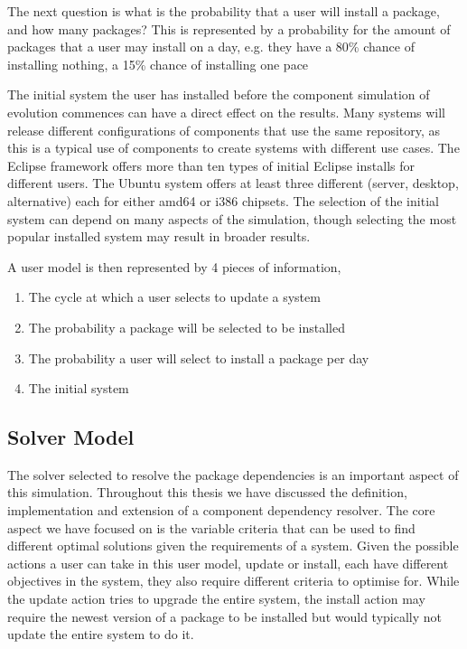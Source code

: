The next question is what is the probability that a user will install a package, and how many packages?
This is represented by a probability for the amount of packages that a user may install on a day,
e.g. they have a 80\% chance of installing nothing, a 15\% chance of installing one pace

The initial system the user has installed before the component simulation of evolution commences can have a direct effect on the results.
Many systems will release different configurations of components that use the same repository, as this is a typical use of components to create systems with different use cases.
The Eclipse framework offers more than ten types of initial Eclipse installs for different users.
The Ubuntu system offers at least three different (server, desktop, alternative) each for either amd64 or i386 chipsets.
The selection of the initial system can depend on many aspects of the simulation, 
though selecting the most popular installed system may result in broader results. 

A user model is then represented by 4 pieces of information,
\begin{enumerate}
  \item  The cycle at which a user selects to update a system
  \item The probability a package will be selected to be installed
  \item The probability a user will select to install a package per day
  \item The initial system
\end{enumerate}


\subsection{Solver Model}
The solver selected to resolve the package dependencies is an important aspect of this simulation.
Throughout this thesis we have discussed the definition, implementation and extension of a component dependency resolver.
The core aspect we have focused on is the variable criteria that can be used to find different optimal solutions given the requirements of a system.
Given the possible actions a user can take in this user model, update or install, each have different objectives in the system,
they also require different criteria to optimise for.
While the update action tries to upgrade the entire system, 
the install action may require the newest version of a package to be installed but would typically not update the entire system to do it. 

